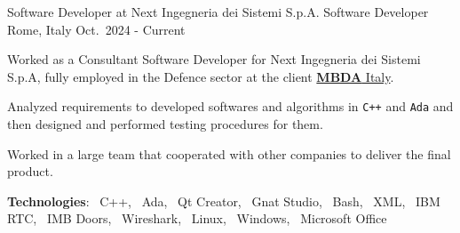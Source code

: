 

\begin{cventries}


    \cventry
    {Software Developer at Next Ingegneria dei Sistemi S.p.A.}
    {Software Developer}
    {Rome, Italy}
    {Oct.\ 2024 - Current}
    {
        \begin{cvitems} %
            \item Worked as a Consultant Software Developer for Next Ingegneria dei Sistemi S.p.A, fully employed in the Defence sector at the client \href{https://www.mbda-systems.com/country-it?rc=1}{\textbf{MBDA} Italy}.
            \item Analyzed requirements to developed softwares and algorithms in \texttt{C++} and \texttt{Ada} and then designed and performed testing procedures for them.
            \item Worked in a large team that cooperated with other companies to deliver the final product.
            \item[] \textbf{\textcolor{awesome-red}{Tec}hnologies}: \cpplogo{}~C++, \adalogo{}~Ada, \qtlogo{}~Qt Creator, \gnatlogo{}~Gnat Studio, \bashlogo{}~Bash, \xmllogo{}~XML, \rtclogo{}~IBM RTC, \doorslogo{}~IMB Doors, \wiresharklogo{}~Wireshark, \linuxlogo{}~Linux, \windowslogo{}~Windows, \officelogo{}~Microsoft Office
        \end{cvitems}
    }

    

\end{cventries}
